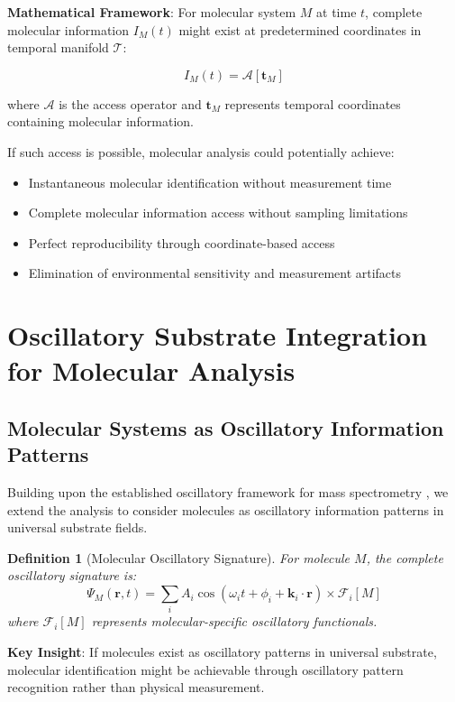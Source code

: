 \documentclass[11pt,a4paper]{article}
\newtheorem{definition}[theorem]{Definition}
\theoremstyle{remark}
\begin{document}
\textbf{Mathematical Framework}: For molecular system $M$ at time $t$, complete molecular information $I_M(t)$ might exist at predetermined coordinates in temporal manifold $\mathcal{T}$:

$$I_M(t) = \mathcal{A}[\mathbf{t}_M]$$

where $\mathcal{A}$ is the access operator and $\mathbf{t}_M$ represents temporal coordinates containing molecular information.

If such access is possible, molecular analysis could potentially achieve:
\begin{itemize}
\item Instantaneous molecular identification without measurement time
\item Complete molecular information access without sampling limitations  
\item Perfect reproducibility through coordinate-based access
\item Elimination of environmental sensitivity and measurement artifacts
\end{itemize}

\section{Oscillatory Substrate Integration for Molecular Analysis}

\subsection{Molecular Systems as Oscillatory Information Patterns}

Building upon the established oscillatory framework for mass spectrometry \cite{sachikonye2024oscillatory}, we extend the analysis to consider molecules as oscillatory information patterns in universal substrate fields.

\begin{definition}[Molecular Oscillatory Signature]
For molecule $M$, the complete oscillatory signature is:
$$\Psi_M(\mathbf{r}, t) = \sum_i A_i \cos(\omega_i t + \phi_i + \mathbf{k}_i \cdot \mathbf{r}) \times \mathcal{F}_i[M]$$
where $\mathcal{F}_i[M]$ represents molecular-specific oscillatory functionals.
\end{definition}

\textbf{Key Insight}: If molecules exist as oscillatory patterns in universal substrate, molecular identification might be achievable through oscillatory pattern recognition rather than physical measurement.
\end{document}
